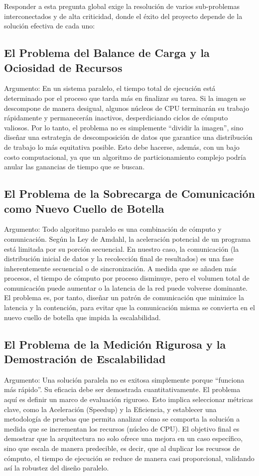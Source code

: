 \documentclass[fleqn,10pt]{article}
\begin{document}
Responder a esta pregunta global exige la resolución de varios sub-problemas interconectados y de alta criticidad, donde el éxito del proyecto depende de la solución efectiva de cada uno:

\subsection{El Problema del Balance de Carga y la Ociosidad de Recursos}
Argumento: En un sistema paralelo, el tiempo total de ejecución está determinado por el proceso que tarda más en finalizar su tarea. Si la imagen se descompone de manera desigual, algunos núcleos de CPU terminarán su trabajo rápidamente y permanecerán inactivos, desperdiciando ciclos de cómputo valiosos. Por lo tanto, el problema no es simplemente ``dividir la imagen'', sino diseñar una estrategia de descomposición de datos que garantice una distribución de trabajo lo más equitativa posible. Esto debe hacerse, además, con un bajo costo computacional, ya que un algoritmo de particionamiento complejo podría anular las ganancias de tiempo que se buscan.

\subsection{El Problema de la Sobrecarga de Comunicación como Nuevo Cuello de Botella}
Argumento: Todo algoritmo paralelo es una combinación de cómputo y comunicación. Según la Ley de Amdahl, la aceleración potencial de un programa está limitada por su porción secuencial. En nuestro caso, la comunicación (la distribución inicial de datos y la recolección final de resultados) es una fase inherentemente secuencial o de sincronización. A medida que se añaden más procesos, el tiempo de cómputo por proceso disminuye, pero el volumen total de comunicación puede aumentar o la latencia de la red puede volverse dominante. El problema es, por tanto, diseñar un patrón de comunicación que minimice la latencia y la contención, para evitar que la comunicación misma se convierta en el nuevo cuello de botella que impida la escalabilidad.

\subsection{El Problema de la Medición Rigurosa y la Demostración de Escalabilidad}
Argumento: Una solución paralela no es exitosa simplemente porque ``funciona más rápido''. Su eficacia debe ser demostrada cuantitativamente. El problema aquí es definir un marco de evaluación riguroso. Esto implica seleccionar métricas clave, como la Aceleración (Speedup) y la Eficiencia, y establecer una metodología de pruebas que permita analizar cómo se comporta la solución a medida que se incrementan los recursos (núcleo de CPU). El objetivo final es demostrar que la arquitectura no solo ofrece una mejora en un caso específico, sino que escala de manera predecible, es decir, que al duplicar los recursos de cómputo, el tiempo de ejecución se reduce de manera casi proporcional, validando así la robustez del diseño paralelo.
\end{document}
